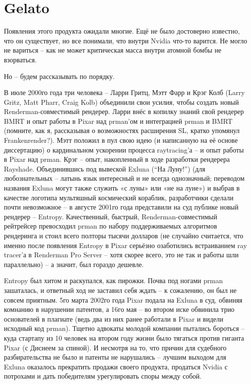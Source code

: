  \chapter*{Gelato}
  

 Появления этого продукта ожидали многие. Ещё не
    было достоверно известно, что он существует, но все понимали, что
    внутри Nvidia что-то варится. Не могло не вариться – как не может
    критическая масса внутри атомной бомбы не взорваться.
  

 Но – будем рассказывать по порядку.
  

 В июле 2000го года три человека – Ларри Гритц, Мэтт
    Фарр и Крэг Колб (Larry Gritz, Matt Pharr, Craig Kolb) объединили
    свои усилия, чтобы создать новый Renderman-совместимый рендерер.
    Ларри внёс в копилку знаний свой рендерер BMRT и опыт работы в
    Pixar над prman’ом и интеграцией prman и BMRT (помните, как я,
    рассказывая о возможностях расширения SL, кратко упомянул
    Frankenrender?). Мэтт положил в пул свою идею (и написанную на её
    основе диссертацию) о кардинальном ускорении процесса raytracing’а
    – и опыт работы в Pixar над prman. Крэг – опыт, накопленный в ходе
    разработки рендерера Rayshade. Объединившись под вывеской Exluna
    (“На Луну!”) (для любознательных – латынь язык интересный и не
    всегда однозначный; переводом названия Exluna могут также служить
    «с луны» или «не на луне») и выбрав в качестве логотипа мультяшный
    космический кораблик, разработчики сделали почти невозможное – в
    августе 2001го года представили на суд публике новый рендерер –
    Entropy. Качественный, быстрый, Renderman-совместимый рейтрейсер
    превосходил prman по набору поддерживаемых алгоритмов рендеринга и
    стоил всего полторы тысячи долларов (не случайно считается, что
    именно после появления Entropy в Pixar серьёзно озаботились
    встраиванием ray tracer’а в Renderman Pro Server – хотя скорее
    всего, это не так и работы шли параллельно) – а значит, был гораздо
    дешевле.
  

 Entropy был хитом и раскупался, как пирожки. Почва
    под ногами prman зашаталась, и ответный ход не заставил себя ждать
    – к сожалению, он был не совсем приятным. 5го марта 2002го года
    Pixar подала на Exluna в суд, обвиняя комнанию в нарушении
    патентов, а 16го мая – во втором иске обвинила трио основателей в
    плагиате (ведь два из них ранее работали в Pixar и видели исходный
    код prman). Тщетно адвокаты молодой компании пытались бороться –
    куда стартапу из 10 человек на втором году жизни было тягаться
    против гиганта Pixar (с Диснеем за спиной). И несмотря на то, что
    причин для судебного разбирательства не было и патенты не
    нарушались – лучшим выходом для Exluna оказалось прекратить продажи
    своего продукта, продаться Nvidia с потрохами и дать победителям
    урегулировать споры между собой.
  

